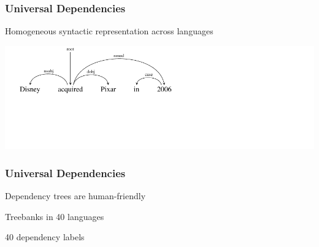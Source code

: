 \documentclass[mathserif,12pt]{beamer}
\begin{document}
\begin{frame}
\frametitle{Universal Dependencies}
\large Homogeneous syntactic representation across languages

\begin{center}
\includegraphics[trim=0em 5em 15em 0em,clip=true,scale=1.2
]{figures/dependency-word-order-english}

\end{center}
\end{frame} 

\begin{frame}[noframenumbering]
\frametitle{Universal Dependencies}

\large
Dependency trees are human-friendly

\vspace{2em}
Treebanks in 40 languages

\vspace{2em}

40 dependency labels

\end{frame} 
\end{document}
